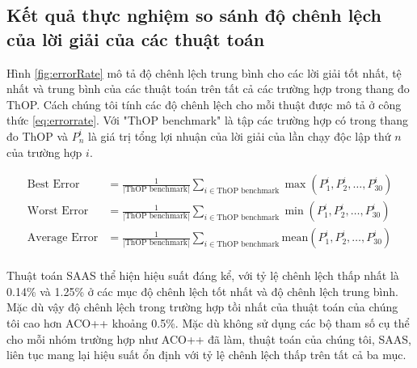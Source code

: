 \subsection{Kết quả thực nghiệm so sánh độ chênh lệch của lời giải của các thuật toán}
\label{sec:errorRate}
Hình \ref{fig:errorRate} mô tả độ chênh lệch trung bình cho các lời giải tốt nhất, tệ nhất và trung bình của các thuật toán trên tất cả các trường hợp trong thang đo ThOP. Cách chúng tôi tính các độ chênh lệch cho mỗi thuật được mô tả ở công thức \ref{eq:errorrate}. Với "ThOP benchmark" là tập các trường hợp có trong thang đo ThOP và $P_n^i$ là giá trị tổng lợi nhuận của lời giải của lần chạy độc lập thứ $n$ của trường hợp $i$.

\begin{equation}\label{eq:errorrate}
\begin{split}
    \text{Best Error} & = \frac{1}{|\text{ThOP benchmark}|}\sum_{i\in \text{ThOP benchmark}}\max(P_1^i, P_2^i, \ldots, P_{30}^i) \\
    \text{Worst Error} & = \frac{1}{|\text{ThOP benchmark}|}\sum_{i\in \text{ThOP benchmark}}\min(P_1^i, P_2^i, \ldots, P_{30}^i) \\
    \text{Average Error} & = \frac{1}{|\text{ThOP benchmark}|}\sum_{i\in \text{ThOP benchmark}}\text{mean}(P_1^i, P_2^i, \ldots, P_{30}^i) \\
\end{split}
\end{equation}

Thuật toán SAAS thể hiện hiệu suất đáng kể, với tỷ lệ chênh lệch thấp nhất là 0.14\% và 1.25\% ở các mục độ chênh lệch tốt nhất và độ chênh lệch trung bình. Mặc dù vậy độ chênh lệch trong trường hợp tồi nhất của thuật toán của chúng tôi cao hơn ACO++ khoảng 0.5\%. Mặc dù không sử dụng các bộ tham số cụ thể cho mỗi nhóm trường hợp như ACO++ đã làm, thuật toán của chúng tôi, SAAS, liên tục mang lại hiệu suất ổn định với tỷ lệ chênh lệch thấp trên tất cả ba mục.

